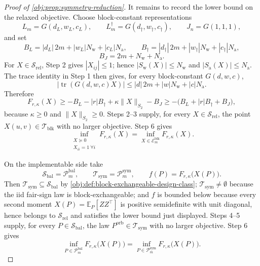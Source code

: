 \begin{proof}[Proof of \cref{obj:prop:symmetry-reduction}]
It remains to record the lower bound on the relaxed objective.  Choose block-constant representations
\[
L_m=G(d_L,w_L,c_L),
\qquad
L_m^\dagger=G(d_\dagger,w_\dagger,c_\dagger),
\qquad
J_n=G(1,1,1),
\]
and set
\[
B_L=|d_L|\,2m+|w_L|N_{\mathrm{w}}+|c_L|N_{\mathrm{a}},
\qquad
B_\dagger=|d_\dagger|\,2m+|w_\dagger|N_{\mathrm{w}}+|c_\dagger|N_{\mathrm{a}},
\]
\[
B_J=2m+N_{\mathrm{w}}+N_{\mathrm{a}} .
\]
For \(X\in\mathcal S_{\mathrm{rel}}\), Step 2 gives \(|X_{ij}|\le1\); hence \(|S_{\mathrm{w}}(X)|\le N_{\mathrm{w}}\) and \(|S_{\mathrm{a}}(X)|\le N_{\mathrm{a}}\).  The trace identity in Step 1 then gives, for every block-constant \(G(d,w,c)\),
\[
\bigl|\operatorname{tr}(G(d,w,c)X)\bigr|
\le |d|\,2m+|w|N_{\mathrm{w}}+|c|N_{\mathrm{a}} .
\]
Therefore
\[
F_{r,\kappa}(X)
\ge -B_L-|r|B_\dagger+\kappa\|X\|_{S_2}-B_J
\ge -\bigl(B_L+|r|B_\dagger+B_J\bigr),
\]
because \(\kappa\ge0\) and \(\|X\|_{S_2}\ge0\). %
Steps 2--3 supply, for every \(X\in\mathcal S_{\mathrm{rel}}\), the point \(X(u,v)\in\mathcal T_{\mathrm{blk}}\) with no larger objective.  Step 6 gives
\[
\inf_{\substack{X\succeq0\\ X_{ii}=1\ \forall i}}F_{r,\kappa}(X)
=\inf_{X\in\mathcal E_m^{\mathrm{blk}}}F_{r,\kappa}(X).
\]

On the implementable side take
\[
\mathcal S_{\mathrm{bal}}=\mathcal P_m^{\mathrm{bal}},
\qquad
\mathcal T_{\mathrm{sym}}=\mathcal P_m^{\mathrm{sym}},
\qquad
f(P)=F_{r,\kappa}\bigl(X(P)\bigr).
\]
Then \(\mathcal T_{\mathrm{sym}}\subseteq\mathcal S_{\mathrm{bal}}\) by \cref{obj:def:block-exchangeable-design-class}; \(\mathcal T_{\mathrm{sym}}\ne\emptyset\) because the iid fair-sign law is block-exchangeable; %
and \(f\) is bounded below because every second moment \(X(P)=\mathbb E_P[ZZ^\top]\) is positive semidefinite with unit diagonal, hence belongs to \(\mathcal S_{\mathrm{rel}}\) and satisfies the lower bound just displayed. %
Steps 4--5 supply, for every \(P\in\mathcal S_{\mathrm{bal}}\), the law \(P^{\mathrm{orb}}\in\mathcal T_{\mathrm{sym}}\) with no larger objective.  Step 6 gives
\[
\inf_{P\in\mathcal P_m^{\mathrm{bal}}}F_{r,\kappa}\bigl(X(P)\bigr)
=\inf_{P\in\mathcal P_m^{\mathrm{sym}}}F_{r,\kappa}\bigl(X(P)\bigr).
\]
\end{proof}

